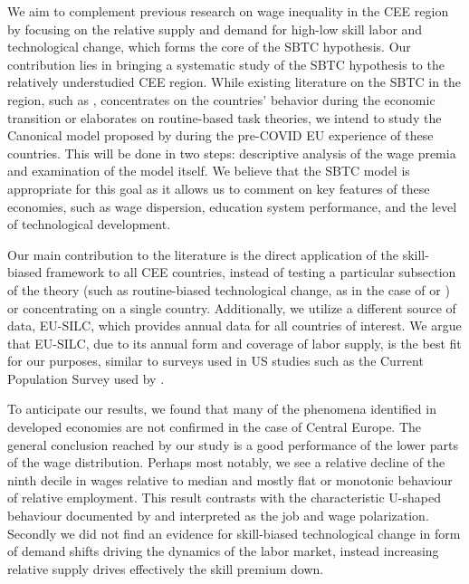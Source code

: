 \documentclass[11pt]{article}
\begin{document}
We aim to complement previous research on wage inequality in the CEE region by focusing on the relative supply and demand for high-low skill labor and technological change, which forms the core of the SBTC hypothesis. Our contribution lies in bringing a systematic study of the SBTC hypothesis to the relatively understudied CEE region. While existing literature on the SBTC in the region, such as \citet{tyrowicz2019wage}, concentrates on the countries' behavior during the economic transition or elaborates on routine-based task theories, we intend to study the Canonical model proposed by \citet{katz1992changes} during the pre-COVID EU experience of these countries. This will be done in two steps: descriptive analysis of the wage premia and examination of the model itself. We believe that the SBTC model is appropriate for this goal as it allows us to comment on key features of these economies, such as wage dispersion, education system performance, and the level of technological development.

Our main contribution to the literature is the direct application of the skill-biased framework to all CEE countries, instead of testing a particular subsection of the theory (such as routine-biased technological change, as in the case of \citet{arendt2019technical} or \citet{hardy2018educational}) or concentrating on a single country. Additionally, we utilize a different source of data, EU-SILC, which provides annual data for all countries of interest. We argue that EU-SILC, due to its annual form and coverage of labor supply, is the best fit for our purposes, similar to surveys used in US studies such as the Current Population Survey used by \citet{katz1992changes}.

To anticipate our results, we found that many of the phenomena identified in developed economies are not confirmed in the case of Central Europe. The general conclusion reached by our study is a good performance of the lower parts of the wage distribution. Perhaps most notably, we see a relative decline of the ninth decile in wages relative to median and mostly flat or monotonic behaviour of relative employment. This result contrasts with the characteristic U-shaped behaviour documented by \citet{acemoglu2012does} and interpreted as the job and wage polarization. Secondly we did not find an evidence for skill-biased technological change in form of demand shifts driving the dynamics of the labor market, instead increasing relative supply drives effectively the skill premium down. %
\end{document}
